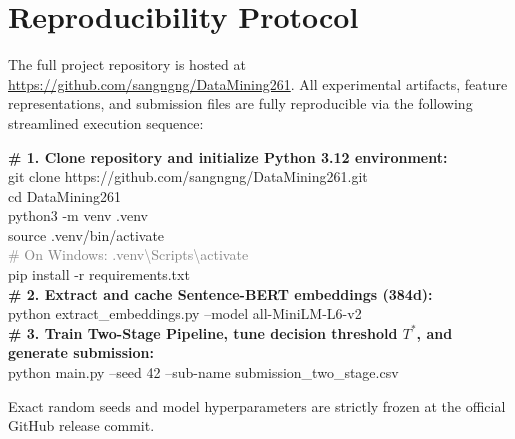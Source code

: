 \section{Reproducibility Protocol}
The full project repository is hosted at \url{https://github.com/sangngng/DataMining261}. All experimental artifacts, feature representations, and submission files are fully reproducible via the following streamlined execution sequence:

\begin{prismbox}[title=\textbf{End-to-End Command Sequence}]
\small\ttfamily
\textcolor{PrismDark}{\textbf{\# 1. Clone repository and initialize Python 3.12 environment:}}\\
git clone https://github.com/sangngng/DataMining261.git\\
cd DataMining261\\
python3 -m venv .venv\\
source .venv/bin/activate\\
\textcolor{gray}{\# On Windows: .venv\textbackslash Scripts\textbackslash activate}\\
pip install -r requirements.txt\\[5pt]
\textcolor{PrismDark}{\textbf{\# 2. Extract and cache Sentence-BERT embeddings (384d):}}\\
python extract_embeddings.py --model all-MiniLM-L6-v2\\[5pt]
\textcolor{PrismDark}{\textbf{\# 3. Train Two-Stage Pipeline, tune decision threshold $T^*$, and generate submission:}}\\
python main.py --seed 42 --sub-name submission_two_stage.csv
\end{prismbox}

Exact random seeds and model hyperparameters are strictly frozen at the official GitHub release commit.
